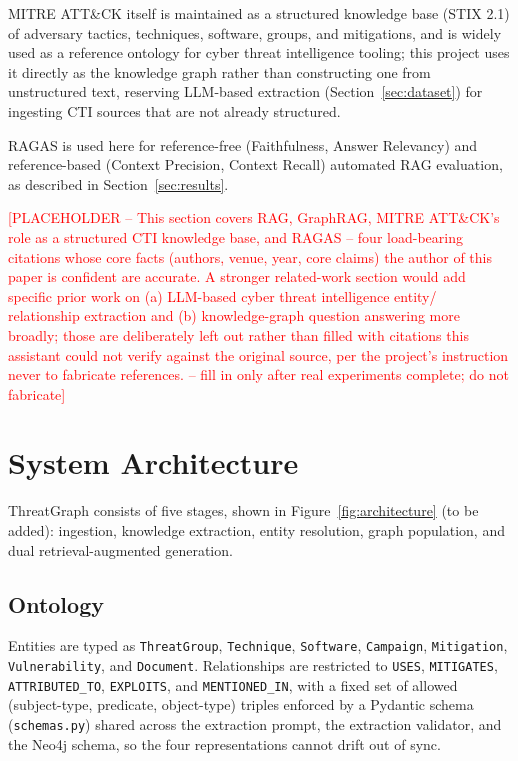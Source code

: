 \documentclass[conference]{IEEEtran}
\newcommand{\todoplaceholder}[1]{\textcolor{red}{[PLACEHOLDER -- #1 -- fill in only after real experiments complete; do not fabricate]}}
\begin{document}
MITRE ATT\&CK itself is maintained as a structured knowledge base (STIX
2.1) of adversary tactics, techniques, software, groups, and mitigations,
and is widely used as a reference ontology for cyber threat intelligence
tooling; this project uses it directly as the knowledge graph rather than
constructing one from unstructured text, reserving LLM-based extraction
(Section~\ref{sec:dataset}) for ingesting CTI sources that are not already
structured.

RAGAS \cite{es2024ragas} is used here for reference-free
(Faithfulness, Answer Relevancy) and reference-based (Context Precision,
Context Recall) automated RAG evaluation, as described in
Section~\ref{sec:results}.

\todoplaceholder{This section covers RAG, GraphRAG, MITRE ATT\&CK's role as
a structured CTI knowledge base, and RAGAS -- four load-bearing citations
whose core facts (authors, venue, year, core claims) the author of this
paper is confident are accurate. A stronger related-work section would add
specific prior work on (a) LLM-based cyber threat intelligence entity/
relationship extraction and (b) knowledge-graph question answering more
broadly; those are deliberately left out rather than filled with citations
this assistant could not verify against the original source, per the
project's instruction never to fabricate references.}

\section{System Architecture}
ThreatGraph consists of five stages, shown in Figure~\ref{fig:architecture}
(to be added): ingestion, knowledge extraction, entity resolution, graph
population, and dual retrieval-augmented generation.

\subsection{Ontology}
Entities are typed as \texttt{ThreatGroup}, \texttt{Technique},
\texttt{Software}, \texttt{Campaign}, \texttt{Mitigation},
\texttt{Vulnerability}, and \texttt{Document}. Relationships are restricted
to \texttt{USES}, \texttt{MITIGATES}, \texttt{ATTRIBUTED\_TO},
\texttt{EXPLOITS}, and \texttt{MENTIONED\_IN}, with a fixed set of allowed
(subject-type, predicate, object-type) triples enforced by a Pydantic schema
(\texttt{schemas.py}) shared across the extraction prompt, the extraction
validator, and the Neo4j schema, so the four representations cannot drift
out of sync.
\end{document}
